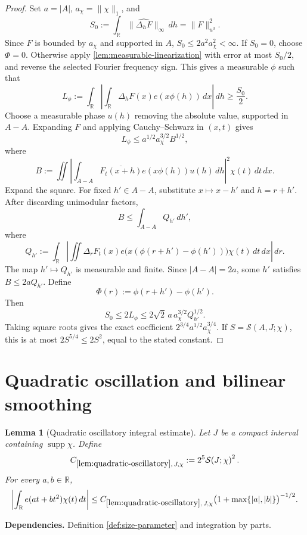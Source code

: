 \documentclass[11pt]{article}
\newtheorem{lemma}[lemma]{Lemma}
\theoremstyle{definition}
\theoremstyle{remark}
\newcommand{\R}{\mathbb R}
\newcommand{\supp}{\operatorname{supp}}
\newcommand{\1}{\mathbf 1}
\newcommand{\FT}[1]{\widehat{#1}}
\newcommand{\dd}{\,d}
\newcommand{\uNorm}[2]{\lVert #1\rVert_{u^{#2}}}
\newcommand{\lpNorm}[2]{\lVert #1\rVert_{#2}}
\newcommand{\uses}[1]{\par\smallskip\noindent\textbf{Dependencies.} #1\par\smallskip}
\newcommand{\Ssize}[2]{\mathcal S\!\left(#1;#2\right)}
\begin{document}
\begin{proof}
Set $a=\lvert A\rvert$, $a_\chi=\lpNorm\chi1$, and
\[
S_0:=\int_\R\lpNorm{\FT{\Delta_hF}}\infty\dd h=\uNorm F3^2.
\]
Since $F$ is bounded by $a_\chi$ and supported in $A$,
$S_0\leq2a^2a_\chi^2<\infty$.  If $S_0=0$, choose $\Phi=0$.  Otherwise apply \cref{lem:measurable-linearization} with error at most $S_0/2$, and reverse the selected Fourier frequency sign.  This gives a measurable $\phi$ such that
\[
L_\phi
:=
\int_\R
\left|
\int_\R\Delta_hF(x)e(x\phi(h))\dd x
\right|\dd h
\geq\frac{S_0}{2}.
\]
Choose a measurable phase $u(h)$ removing the absolute value, supported in $A-A$.  Expanding $F$ and applying Cauchy--Schwarz in $(x,t)$ gives
\[
L_\phi\leq a^{1/2}a_\chi^{3/2}B^{1/2},
\]
where
\[
B:=
\iint
\left|
\int_{A-A}\overline{F_t(x+h)}e(x\phi(h))u(h)\dd h
\right|^2
\chi(t)\dd t\dd x.
\]
Expand the square.  For fixed $h'\in A-A$, substitute $x\mapsto x-h'$ and $h=r+h'$.  After discarding unimodular factors,
\[
B\leq\int_{A-A}Q_{h'}\dd h',
\]
where
\[
Q_{h'}:=
\int_\R
\left|
\iint
\Delta_rF_t(x)
 e\bigl(x(\phi(r+h')-\phi(h'))\bigr)
\chi(t)\dd t\dd x
\right|\dd r.
\]
The map $h'\mapsto Q_{h'}$ is measurable and finite.  Since $|A-A|=2a$, some $h'$ satisfies $B\leq2aQ_{h'}$.  Define
\[
\Phi(r):=\phi(r+h')-\phi(h').
\]
Then
\[
S_0\leq2L_\phi
\leq
2\sqrt2\,a\,a_\chi^{3/2}Q_{h'}^{1/2}.
\]
Taking square roots gives the exact coefficient
$2^{3/4}a^{1/2}a_\chi^{3/4}$.  If
$S=\Ssize{A,J}{\chi}$, this is at most
$2S^{5/4}\leq2S^2$, equal to the stated constant.
\end{proof}

\section{Quadratic oscillation and bilinear smoothing}

\begin{lemma}[Quadratic oscillatory integral estimate]\label{lem:quadratic-oscillatory}
Let $J$ be a compact interval containing $\supp\chi$.  Define
\[
C_{\ref{lem:quadratic-oscillatory},\,J,\chi}
:=
2^5\Ssize{J}{\chi}^{2}.
\]
For every $a,b\in\R$,
\[
\left|
\int_\R e(at+bt^2)\chi(t)\dd t
\right|
\leq
C_{\ref{lem:quadratic-oscillatory},\,J,\chi}
\bigl(1+\max\{|a|,|b|\}\bigr)^{-1/2}.
\]
\end{lemma}

\uses{Definition \ref{def:size-parameter} and integration by parts.}
\end{document}
